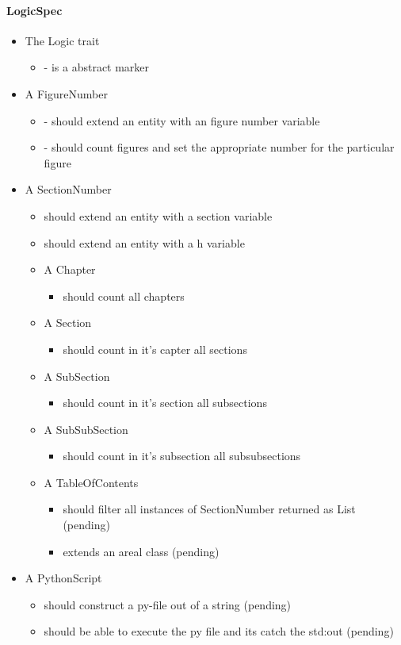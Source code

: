 \paragraph{LogicSpec}

\begin{itemize}
\item The Logic trait
\begin{itemize}
  \item - is a abstract marker
\end{itemize}
\item A FigureNumber
\begin{itemize}
  \item - should extend an entity with an figure number variable
  \item - should count figures and set the appropriate number for the particular figure
\end{itemize}
\item A SectionNumber
\begin{itemize}
  \item should extend an entity with a section variable
  \item should extend an entity with a h variable
  \item A Chapter
  \begin{itemize}
    \item should count all chapters
  \end{itemize}
  \item A Section
  \begin{itemize}
    \item should count in it's capter all sections
  \end{itemize}
  \item A SubSection 
  \begin{itemize}
    \item should count in it's section all subsections
  \end{itemize}
  \item A SubSubSection
  \begin{itemize}
    \item should count in it's subsection all subsubsections
  \end{itemize}
  \item   A TableOfContents 
  \begin{itemize}
    \item should filter all instances of SectionNumber returned as List (pending)
    \item extends an areal class (pending)
  \end{itemize}
\end{itemize}
\item A PythonScript
\begin{itemize}
  \item should construct a py-file out of a string (pending)
  \item should be able to execute the py file and its catch the std:out (pending)
\end{itemize}
\end{itemize}

